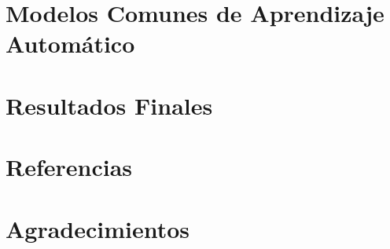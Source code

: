 \documentclass{beamer}
\begin{document}
\section{Modelos Comunes de Aprendizaje Automático}

\begin{frame}
	
\end{frame}

\section{Resultados Finales}

\begin{frame}
	
\end{frame}

\section{Referencias}

\section{Agradecimientos}

\begin{frame}
	
\end{frame}
\end{document}

